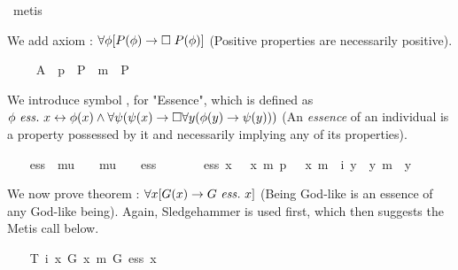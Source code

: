 \begin{isabellebody}
\ metis%
\endisatagproof
{\isafoldproof}%
%
\isadelimproof
%
\endisadelimproof
%
\begin{isamarkuptext}%
We add axiom : $\forall \phi [P(\phi) \to \Box \; P(\phi)]$ 
 (Positive properties are necessarily positive).%
\end{isamarkuptext}%
\isamarkuptrue%
\ \ \isamarkupfalse%
\ \ A{}{\isacharcolon}\ \ {\isachardoublequoteopen}{\isacharbrackleft}{\isasymforall}p\ {\isacharparenleft}{\isasymlambda}{\isasymPhi}{\isachardot}\ P\ {\isasymPhi}\ m{\isasymRightarrow}\ {\isasymbox}\ {\isacharparenleft}P\ {\isasymPhi}{\isacharparenright}{\isacharparenright}{\isacharbrackright}{\isachardoublequoteclose}%
\begin{isamarkuptext}%
We introduce symbol , for "Essence", which is defined as 
 $\phi \ \mathit{ess.} \ x \leftrightarrow \phi(x) \wedge \forall \psi (\psi(x) \rightarrow \Box \forall y (\phi(y) 
 \rightarrow \psi(y)))$ (An \emph{essence} of an individual is a property possessed by it 
 and necessarily implying any of its properties).%
\end{isamarkuptext}%
\isamarkuptrue%
\ \ \isamarkupfalse%
\ ess\ {\isacharcolon}{\isacharcolon}\ {\isachardoublequoteopen}{\isacharparenleft}mu\ {\isasymRightarrow}\ {\isasymsigma}{\isacharparenright}\ {\isasymRightarrow}\ mu\ {\isasymRightarrow}\ {\isasymsigma}{\isachardoublequoteclose}\ {\isacharparenleft}\ {\isachardoublequoteopen}ess{\isachardoublequoteclose}\ {}{}{\isacharparenright}\ \isanewline
\ \ \ \ {\isachardoublequoteopen}{\isasymPhi}\ ess\ x\ {\isacharequal}\ {\isasymPhi}\ x\ m{\isasymand}\ {\isasymforall}p\ {\isacharparenleft}{\isasymlambda}{\isasympsi}{\isachardot}\ {\isasympsi}\ x\ m{\isasymRightarrow}\ {\isasymbox}\ {\isacharparenleft}{\isasymforall}i\ {\isacharparenleft}{\isasymlambda}y{\isachardot}\ {\isasymPhi}\ y\ m{\isasymRightarrow}\ {\isasympsi}\ y{\isacharparenright}{\isacharparenright}{\isacharparenright}{\isachardoublequoteclose}%
\begin{isamarkuptext}%
We now prove theorem : $\forall x [G(x) \rightarrow G \ \mathit{ess.} \ x]$ (Being 
 God-like is an essence of any God-like being). Again, Sledgehammer is used first, 
 which then suggests the Metis call below.%
\end{isamarkuptext}%
\isamarkuptrue%
\ \ \isamarkupfalse%
\ T{}{\isacharcolon}\ {\isachardoublequoteopen}{\isacharbrackleft}{\isasymforall}i\ {\isacharparenleft}{\isasymlambda}x{\isachardot}\ G\ x\ m{\isasymRightarrow}\ G\ ess\ x{\isacharparenright}{\isacharbrackright}{\isachardoublequoteclose}\isanewline

\end{isabellebody}
